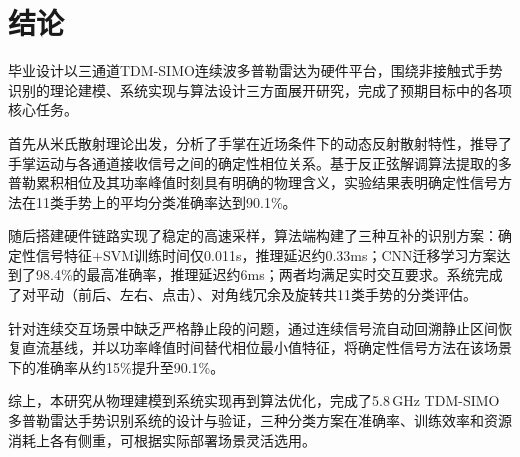 \section{结论}

毕业设计以三通道TDM-SIMO连续波多普勒雷达为硬件平台，围绕非接触式手势识别的理论建模、系统实现与算法设计三方面展开研究，完成了预期目标中的各项核心任务。

首先从米氏散射理论出发，分析了手掌在近场条件下的动态反射散射特性，推导了手掌运动与各通道接收信号之间的确定性相位关系。基于反正弦解调算法提取的多普勒累积相位及其功率峰值时刻具有明确的物理含义，实验结果表明确定性信号方法在11类手势上的平均分类准确率达到90.1\%。

随后搭建硬件链路实现了稳定的高速采样，算法端构建了三种互补的识别方案：确定性信号特征+SVM训练时间仅0.011s，推理延迟约0.33ms；CNN迁移学习方案达到了98.4\%的最高准确率，推理延迟约6ms；两者均满足实时交互要求。系统完成了对平动（前后、左右、点击）、对角线冗余及旋转共11类手势的分类评估。

针对连续交互场景中缺乏严格静止段的问题，通过连续信号流自动回溯静止区间恢复直流基线，并以功率峰值时间替代相位最小值特征，将确定性信号方法在该场景下的准确率从约15\%提升至90.1\%。

综上，本研究从物理建模到系统实现再到算法优化，完成了5.8\,GHz TDM-SIMO多普勒雷达手势识别系统的设计与验证，三种分类方案在准确率、训练效率和资源消耗上各有侧重，可根据实际部署场景灵活选用。
